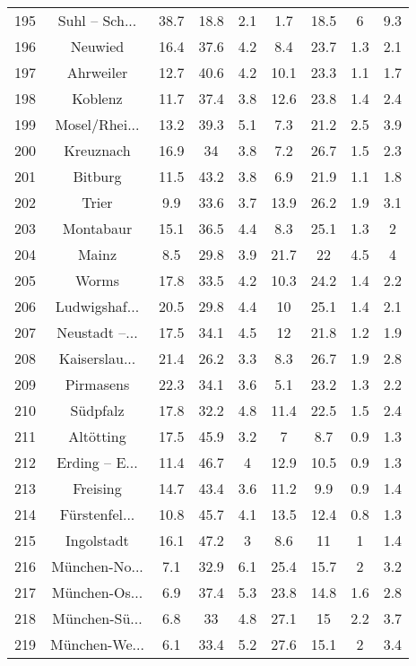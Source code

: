 \begin{table}[!htbp]
\begin{tabular}{@{\extracolsep{5pt}} ccccccccc}
195 & Suhl – Sch... & 38.7 & 18.8 & 2.1 & 1.7 & 18.5 & 6 & 9.3 \\ 
196 & Neuwied & 16.4 & 37.6 & 4.2 & 8.4 & 23.7 & 1.3 & 2.1 \\ 
197 & Ahrweiler & 12.7 & 40.6 & 4.2 & 10.1 & 23.3 & 1.1 & 1.7 \\ 
198 & Koblenz & 11.7 & 37.4 & 3.8 & 12.6 & 23.8 & 1.4 & 2.4 \\ 
199 & Mosel/Rhei... & 13.2 & 39.3 & 5.1 & 7.3 & 21.2 & 2.5 & 3.9 \\ 
200 & Kreuznach & 16.9 & 34 & 3.8 & 7.2 & 26.7 & 1.5 & 2.3 \\ 
201 & Bitburg & 11.5 & 43.2 & 3.8 & 6.9 & 21.9 & 1.1 & 1.8 \\ 
202 & Trier & 9.9 & 33.6 & 3.7 & 13.9 & 26.2 & 1.9 & 3.1 \\ 
203 & Montabaur & 15.1 & 36.5 & 4.4 & 8.3 & 25.1 & 1.3 & 2 \\ 
204 & Mainz & 8.5 & 29.8 & 3.9 & 21.7 & 22 & 4.5 & 4 \\ 
205 & Worms & 17.8 & 33.5 & 4.2 & 10.3 & 24.2 & 1.4 & 2.2 \\ 
206 & Ludwigshaf... & 20.5 & 29.8 & 4.4 & 10 & 25.1 & 1.4 & 2.1 \\ 
207 & Neustadt –... & 17.5 & 34.1 & 4.5 & 12 & 21.8 & 1.2 & 1.9 \\ 
208 & Kaiserslau... & 21.4 & 26.2 & 3.3 & 8.3 & 26.7 & 1.9 & 2.8 \\ 
209 & Pirmasens & 22.3 & 34.1 & 3.6 & 5.1 & 23.2 & 1.3 & 2.2 \\ 
210 & Südpfalz & 17.8 & 32.2 & 4.8 & 11.4 & 22.5 & 1.5 & 2.4 \\ 
211 & Altötting & 17.5 & 45.9 & 3.2 & 7 & 8.7 & 0.9 & 1.3 \\ 
212 & Erding – E... & 11.4 & 46.7 & 4 & 12.9 & 10.5 & 0.9 & 1.3 \\ 
213 & Freising & 14.7 & 43.4 & 3.6 & 11.2 & 9.9 & 0.9 & 1.4 \\ 
214 & Fürstenfel... & 10.8 & 45.7 & 4.1 & 13.5 & 12.4 & 0.8 & 1.3 \\ 
215 & Ingolstadt & 16.1 & 47.2 & 3 & 8.6 & 11 & 1 & 1.4 \\ 
216 & München-No... & 7.1 & 32.9 & 6.1 & 25.4 & 15.7 & 2 & 3.2 \\ 
217 & München-Os... & 6.9 & 37.4 & 5.3 & 23.8 & 14.8 & 1.6 & 2.8 \\ 
218 & München-Sü... & 6.8 & 33 & 4.8 & 27.1 & 15 & 2.2 & 3.7 \\ 
219 & München-We... & 6.1 & 33.4 & 5.2 & 27.6 & 15.1 & 2 & 3.4 \\ 

\end{tabular}
\end{table}
